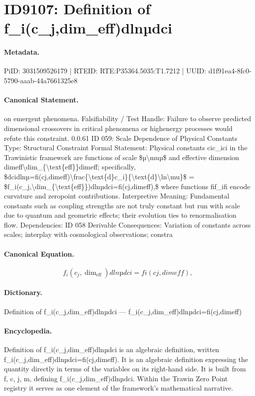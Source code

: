 \section*{ID9107: Definition of f\_i(c\_j,dim\_eff)dlnµdci}
\paragraph{Metadata.}
PiID: 3031509526179 | RTEID: RTE:P35364.5035:T1.7212 | UUID: d1f91ea4-8fc0-5790-aaab-44a7661325e8

\paragraph{Canonical Statement.}
on emergent phenomena. Falsifiability / Test Handle: Failure to observe predicted dimensional crossovers in critical phenomena or highenergy processes would refute this constraint. 0.0.61 ID 059: Scale Dependence of Physical Constants Type: Structural Constraint Formal Statement: Physical constants cic\_ici in the Trawinistic framework are functions of scale \$µ\textbackslash{}muµ\$ and effective dimension dimeff\textbackslash{}dim\_\{\textbackslash{}text\{eff\}\}dimeff; specifically, \$dcidlnµ=fi(cj,dimeff)\textbackslash{}frac\{\textbackslash{}text\{d\}c\_i\}\{\textbackslash{}text\{d\}\textbackslash{}ln\textbackslash{}mu\}\$ = \$f\_i(c\_j,\textbackslash{}dim\_\{\textbackslash{}text\{eff\}\})dlnµdci=fi(cj,dimeff),\$ where functions fif\_ifi encode curvature and zeropoint contributions. Interpretive Meaning: Fundamental constants such as coupling strengths are not truly constant but run with scale due to quantum and geometric effects; their evolution ties to renormalisation flow. Dependencies: ID 058 Derivable Consequences: Variation of constants across scales; interplay with cosmological observations; constra

\paragraph{Canonical Equation.}
\[
f_i(c_j,\dim_{\text{eff}})dlnµdci=fi(cj,dimeff),
\]

\paragraph{Dictionary.}
Definition of f\_i(c\_j,dim\_eff)dlnµdci — f\_i(c\_j,dim\_eff)dlnµdci=fi(cj,dimeff)

\paragraph{Encyclopedia.}
Definition of f\_i(c\_j,dim\_eff)dlnµdci is an algebraic definition, written f\_i(c\_j,dim\_eff)dlnµdci=fi(cj,dimeff). It is an algebraic definition expressing the quantity directly in terms of the variables on its right-hand side. It is built from f, c, j, m, defining f\_i(c\_j,dim\_eff)dlnµdci. Within the Trawin Zero Point registry it serves as one element of the framework's mathematical narrative.
